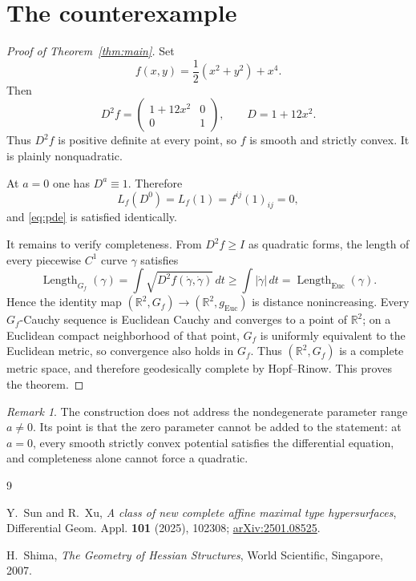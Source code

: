 \documentclass[11pt]{article}
\theoremstyle{remark}
\newtheorem{remark}[theorem]{Remark}
\begin{document}
\section{The counterexample}

\begin{proof}[Proof of Theorem~\ref{thm:main}]
Set
\begin{equation}\label{eq:f}
 f(x,y)=\frac12(x^2+y^2)+x^4.
\end{equation}
Then
\[
 D^2f=
 \begin{pmatrix}
  1+12x^2&0\\
  0&1
 \end{pmatrix},
 \qquad
 D=1+12x^2.
\]
Thus $D^2f$ is positive definite at every point, so $f$ is smooth and
strictly convex.  It is plainly nonquadratic.

At $a=0$ one has $D^a\equiv1$.  Therefore
\[
 L_f(D^0)=L_f(1)=f^{ij}(1)_{ij}=0,
\]
and \eqref{eq:pde} is satisfied identically.

It remains to verify completeness.  From $D^2f\ge I$ as quadratic forms,
the length of every piecewise $C^1$ curve $\gamma$ satisfies
\[
 \operatorname{Length}_{G_f}(\gamma)
 =\int\sqrt{D^2f(\dot\gamma,\dot\gamma)}\,dt
 \ge \int |\dot\gamma|\,dt
 =\operatorname{Length}_{\mathrm{Euc}}(\gamma).
\]
Hence the identity map
$(\mathbb R^2,G_f)\to(\mathbb R^2,g_{\mathrm{Euc}})$ is distance
nonincreasing.  Every $G_f$-Cauchy sequence is Euclidean Cauchy and converges
to a point of $\mathbb R^2$; on a Euclidean compact neighborhood of that
point, $G_f$ is uniformly equivalent to the Euclidean metric, so convergence
also holds in $G_f$.  Thus $(\mathbb R^2,G_f)$ is a complete metric space,
and therefore geodesically complete by Hopf--Rinow.  This proves the theorem.
\end{proof}

\begin{remark}
The construction does not address the nondegenerate parameter range
$a\ne0$.  Its point is that the zero parameter cannot be added to the
statement: at $a=0$, every smooth strictly convex potential satisfies the
differential equation, and completeness alone cannot force a quadratic.
\end{remark}

\begin{thebibliography}{9}

Y.~Sun and R.~Xu,
\emph{A class of new complete affine maximal type hypersurfaces},
Differential Geom. Appl. \textbf{101} (2025), 102308;
\href{https://arxiv.org/abs/2501.08525}{arXiv:2501.08525}.

H.~Shima,
\emph{The Geometry of Hessian Structures},
World Scientific, Singapore, 2007.

\end{thebibliography}
\end{document}
